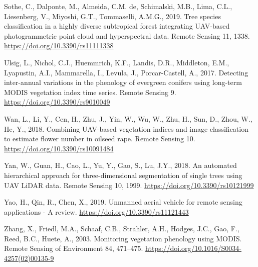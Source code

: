\documentclass[]{article}
\begin{document}
\leavevmode\hypertarget{ref-Sothe2019a}{}%
Sothe, C., Dalponte, M., Almeida, C.M. de, Schimalski, M.B., Lima, C.L.,
Liesenberg, V., Miyoshi, G.T., Tommaselli, A.M.G., 2019. Tree species
classification in a highly diverse subtropical forest integrating
UAV-based photogrammetric point cloud and hyperspectral data. Remote
Sensing 11, 1338. \url{https://doi.org/10.3390/rs11111338}

\leavevmode\hypertarget{ref-Ulsig2017a}{}%
Ulsig, L., Nichol, C.J., Huemmrich, K.F., Landis, D.R., Middleton, E.M.,
Lyapustin, A.I., Mammarella, I., Levula, J., Porcar-Castell, A., 2017.
Detecting inter-annual variations in the phenology of evergreen conifers
using long-term MODIS vegetation index time series. Remote Sensing 9.
\url{https://doi.org/10.3390/rs9010049}

\leavevmode\hypertarget{ref-Wan2018}{}%
Wan, L., Li, Y., Cen, H., Zhu, J., Yin, W., Wu, W., Zhu, H., Sun, D.,
Zhou, W., He, Y., 2018. Combining UAV-based vegetation indices and image
classification to estimate flower number in oilseed rape. Remote Sensing
10. \url{https://doi.org/10.3390/rs10091484}

\leavevmode\hypertarget{ref-Yan2018a}{}%
Yan, W., Guan, H., Cao, L., Yu, Y., Gao, S., Lu, J.Y., 2018. An
automated hierarchical approach for three-dimensional segmentation of
single trees using UAV LiDAR data. Remote Sensing 10, 1999.
\url{https://doi.org/10.3390/rs10121999}

\leavevmode\hypertarget{ref-Yao2019b}{}%
Yao, H., Qin, R., Chen, X., 2019. Unmanned aerial vehicle for remote
sensing applications - A review.
\url{https://doi.org/10.3390/rs11121443}

\leavevmode\hypertarget{ref-Zhang2003}{}%
Zhang, X., Friedl, M.A., Schaaf, C.B., Strahler, A.H., Hodges, J.C.,
Gao, F., Reed, B.C., Huete, A., 2003. Monitoring vegetation phenology
using MODIS. Remote Sensing of Environment 84, 471--475.
\url{https://doi.org/10.1016/S0034-4257(02)00135-9}
\end{document}

